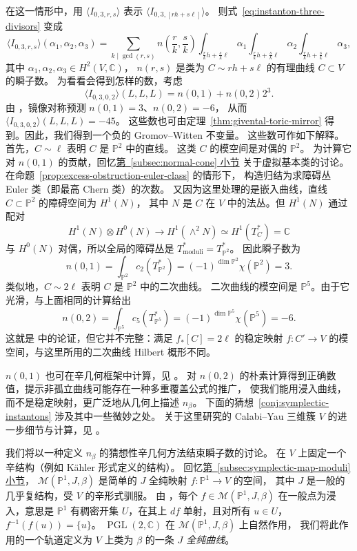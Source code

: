\begin{example}
在这一情形中，用 $\langle I_{0,3,r,s}\rangle$ 表示 $\langle I_{0,3,[rh+s\ell]}\rangle$。
则式~\eqref{eq:instanton-three-divisors} 变成
\[
\langle I_{0,3,r,s}\rangle(\alpha_1,\alpha_2,\alpha_3)
=\sum_{k\mid\gcd(r,s)}n\!\left(\frac r k,\frac s k\right)
\int_{\frac r kh+\frac s k\ell}\alpha_1
\int_{\frac r kh+\frac s k\ell}\alpha_2
\int_{\frac r kh+\frac s k\ell}\alpha_3,
\]
其中 $\alpha_1,\alpha_2,\alpha_3\in H^2(V,\mathbb C)$，
$n(r,s)$ 是类为 $C\sim rh+s\ell$ 的有理曲线 $C\subset V$ 的瞬子数。
为看看会得到怎样的数，考虑
\[
\langle I_{0,3,0,2}\rangle(L,L,L)=n(0,1)+n(0,2)2^3.
\]
由 ，镜像对称预测 $n(0,1)=3$、$n(0,2)=-6$，
从而 $\langle I_{0,3,0,2}\rangle(L,L,L)=-45$。
这些数也可由定理~\ref{thm:givental-toric-mirror} 得到。因此，我们得到一个负的 Gromov--Witten 不变量。
这些数可作如下解释。首先，$C\sim\ell$ 表明 $C$ 是 $\mathbb P^2$ 中的直线。
这类 $C$ 的模空间是对偶的 $\mathbb P^2$。
为计算它对 $n(0,1)$ 的贡献，回忆\hyperref[subsec:normal-cone]{第~\ref*{subsec:normal-cone} 小节}
关于虚拟基本类的讨论。在命题~\ref{prop:excess-obstruction-euler-class} 的情形下，
构造归结为求障碍丛 Euler 类（即最高 Chern 类）的次数。
又因为这里处理的是嵌入曲线，直线 $C\subset\mathbb P^2$ 的障碍空间为 $H^1(N)$，
其中 $N$ 是 $C$ 在 $V$ 中的法丛。但 $H^1(N)$ 通过配对
\[
H^1(N)\otimes H^0(N)\longrightarrow H^1(\wedge^2N)
\simeq H^1(T_C^*)=\mathbb C
\]
与 $H^0(N)$ 对偶，所以全局的障碍丛是 $T^*_{\mathrm{moduli}}=T^*_{\mathbb P^2}$。
因此瞬子数为
\[
n(0,1)=\int_{\mathbb P^2}c_2(T^*_{\mathbb P^2})
=(-1)^{\dim\mathbb P^2}\chi(\mathbb P^2)=3.
\]
类似地，$C\sim2\ell$ 表明 $C$ 是 $\mathbb P^2$ 中的二次曲线。
二次曲线的模空间是 $\mathbb P^5$。由于它光滑，与上面相同的计算给出
\[
n(0,2)=\int_{\mathbb P^5}c_5(T^*_{\mathbb P^5})
=(-1)^{\dim\mathbb P^5}\chi(\mathbb P^5)=-6.
\]
这就是  中的论证，但它并不完整：满足 $f_*[C]=2\ell$ 的稳定映射
$f:C'\to V$ 的模空间，与这里所用的二次曲线 Hilbert 概形不同。

$n(0,1)$ 也可在辛几何框架中计算，见 。
对 $n(0,2)$ 的朴素计算得到正确数值，提示非孤立曲线可能存在一种多重覆盖公式的推广，
使我们能用浸入曲线，而不是稳定映射，更广泛地从几何上描述 $n_\beta$。
下面的猜想~\ref{conj:symplectic-instantons} 涉及其中一些微妙之处。
关于这里研究的 Calabi--Yau 三维簇 $V$ 的进一步细节与计算，见 。
\end{example}

我们将以一种定义 $n_\beta$ 的猜想性辛几何方法结束瞬子数的讨论。
在 $V$ 上固定一个辛结构（例如 Kähler 形式定义的结构）。
回忆\hyperref[subsec:symplectic-map-moduli]{第~\ref*{subsec:symplectic-map-moduli} 小节}，
$\mathcal M(\mathbb P^1,J,\beta)$ 是简单的 $J$ 全纯映射 $f:\mathbb P^1\to V$ 的空间，
其中 $J$ 是一般的几乎复结构，受 $V$ 的辛形式驯服。
由 ，每个 $f\in\mathcal M(\mathbb P^1,J,\beta)$
在一般点为浸入，意思是 $\mathbb P^1$ 有稠密开集 $U$，在其上 $df$ 单射，且对所有 $u\in U$，
$f^{-1}(f(u))=\{u\}$。
$\operatorname{PGL}(2,\mathbb C)$ 在 $\mathcal M(\mathbb P^1,J,\beta)$ 上自然作用，
我们将此作用的一个轨道定义为 $V$ 上类为 $\beta$ 的一条 \emph{$J$ 全纯曲线}。

